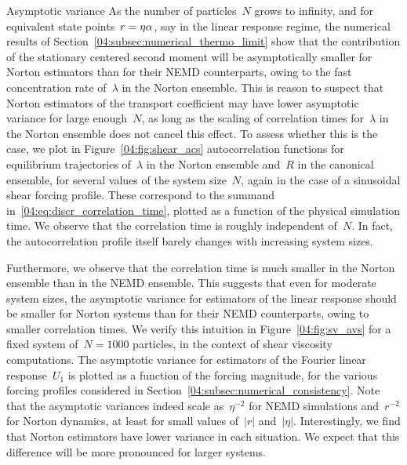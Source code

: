 \begin{subsection}{Asymptotic variance}
    As the number of particles~$N$ grows to infinity, and for equivalent state points~$r = \eta\alpha$, say in the linear response regime, the numerical results of Section~\ref{04:subsec:numerical_thermo_limit} show that the contribution of the stationary centered second moment will be asymptotically smaller for Norton estimators than for their NEMD counterparts, owing to the fast concentration rate of~$\lambda$ in the Norton ensemble. This is reason to suspect that Norton estimators of the transport coefficient may have lower asymptotic variance for large enough~$N$, as long as the scaling of correlation times for~$\lambda$ in the Norton ensemble does not cancel this effect. To assess whether this is the case,  we plot in Figure~\ref{04:fig:shear_acs} autocorrelation functions for equilibrium trajectories of~$\lambda$ in the Norton ensemble and~$R$ in the canonical ensemble, for several values of the system size~$N$, again in the case of a sinusoidal shear forcing profile. These correspond to the summand in~\eqref{04:eq:discr_correlation_time}, plotted as a function of the physical simulation time. We observe that the correlation time is roughly independent of~$N$. In fact, the autocorrelation profile itself barely changes with increasing system sizes.
    
    Furthermore, we observe that the correlation time is much smaller in the Norton ensemble than in the NEMD ensemble. This suggests that even for moderate system sizes, the asymptotic variance for estimators of the linear response should be smaller for Norton systems than for their NEMD counterparts, owing to smaller correlation times. We verify this intuition in Figure~\ref{04:fig:sv_avs} for a fixed system of~$N=1000$ particles, in the context of shear viscosity computations. The asymptotic variance for estimators of the Fourier linear response~$U_1$ is plotted as a function of the forcing magnitude, for the various forcing profiles considered in Section~\ref{04:subsec:numerical_consistency}. Note that the asymptotic variances indeed scale as~$\eta^{-2}$ for NEMD simulations and~$r^{-2}$ for Norton dynamics, at least for small values of~$|r|$ and~$|\eta|$. Interestingly, we find that Norton estimators have lower variance in each situation. We expect that this difference will be more pronounced for larger systems.


\end{subsection}
